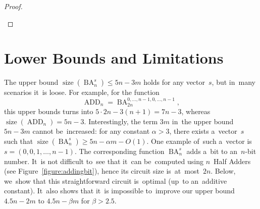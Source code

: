 \documentclass[a4paper, UKenglish, cleveref, autoref,  thm-restate]{lipics-v2021}
\DeclareMathOperator{\ADD}{ADD}
\DeclareMathOperator{\BA}{BA}
\DeclareMathOperator{\size}{size}
\begin{document}
\begin{proof}
\begin{enumerate}
\begin{center}
            \end{center}
        \end{enumerate}
    \end{proof}


    \section{Lower Bounds and Limitations}
    The upper bound $\size(\BA_n^s) \le 5n-3m$ holds for any vector~$s$, but
    in~many scenarios it~is loose. For example, for the function
    \[\ADD_n=\BA_{2n}^{0,\dotsc,n-1,0,\dotsc,n-1},\]
    this upper bounds turns into $5\cdot 2n-3(n+1)=7n-3$,
    whereas $\size(\ADD_n)=5n-3$. Interestingly, the term $3m$ in~the upper bound $5n-3m$ cannot be~increased: for any constant $\alpha > 3$, there exists
    a~vector~$s$ such that $\size(\BA_n^s) \ge 5n-\alpha m-O(1)$.
    One example of~such a~vector is~$s=(0,0,1,\dotsc,n-1)$. The corresponding function $\BA_n^s$ adds a~bit to an~$n$-bit number. It~is not difficult to~see that it~can be~computed using $n$~Half Adders (see Figure~\ref{figure:addingbit}), hence its circuit size is~at~most~$2n$. Below, we~show that this straightforward circuit is~optimal (up~to an~additive constant). It~also shows that it~is
    impossible to~improve our upper bound $4.5n-2m$ to $4.5n-\beta m$ for $\beta > 2.5$.
\end{document}
